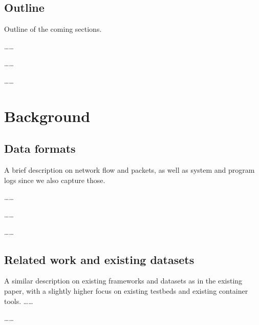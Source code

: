 \documentclass[sigconf]{acmart}
\begin{document}
\subsection{Outline}


Outline of the coming sections.

\dots \dots

\dots \dots

\dots \dots

\section{Background}\label{Sec:background}


\subsection{Data formats}

A brief description on network flow and packets, as well as system and program logs since we also capture those.

\dots \dots

\dots \dots

\dots \dots

\subsection{Related work and existing datasets}

A similar description on existing frameworks and datasets as in the existing paper, with a slightly higher focus on existing testbeds and existing container tools.
\dots \dots

\dots \dots
\end{document}
